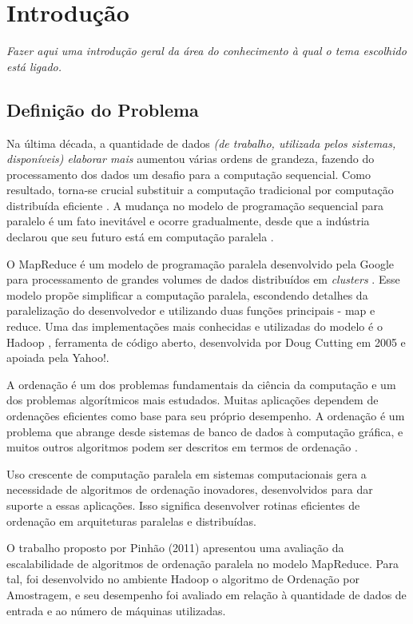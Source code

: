 \chapter{Introdução}
\label{cap:introducao}

\textit{Fazer aqui uma introdução geral da área do conhecimento à qual o tema escolhido está ligado.}

\section{Definição do Problema}

Na última década, a quantidade de dados\textit{ (de trabalho, utilizada pelos sistemas, disponíveis) elaborar mais} aumentou várias ordens de grandeza, fazendo do processamento dos dados um desafio para a computação sequencial. Como resultado, torna-se crucial substituir a computação tradicional por computação distribuída eficiente \cite{Lin:2010}. A mudança no modelo de programação sequencial para paralelo é um fato inevitável e ocorre gradualmente, desde que a indústria declarou que seu futuro está em computação paralela \cite{Asanovic:2009}. 

O MapReduce é um modelo de programação paralela desenvolvido pela Google para processamento de grandes volumes de dados distribuídos em \textit{clusters} \cite{Dean:2008}. Esse modelo propõe simplificar a computação paralela, escondendo detalhes da paralelização do desenvolvedor e utilizando duas funções principais - map e reduce.
Uma das implementações mais conhecidas e utilizadas do modelo é o Hadoop \cite{Hadoop:2010}, ferramenta de código aberto, desenvolvida por Doug Cutting em 2005 e apoiada pela Yahoo!. 


A ordenação é um dos problemas fundamentais da ciência da computação e um dos problemas algorítmicos mais estudados. Muitas aplicações dependem de ordenações eficientes como base para seu próprio desempenho. A ordenação é um problema que abrange desde sistemas de banco de dados à computação gráfica, e muitos outros algoritmos podem ser descritos em termos de ordenação  \cite{Satish:2009,Amato:1996}.  

Uso crescente de computação paralela em sistemas computacionais gera a necessidade de algoritmos de ordenação inovadores, desenvolvidos para dar suporte a essas aplicações. Isso significa desenvolver rotinas eficientes de ordenação em arquiteturas paralelas e distribuídas. 

O trabalho proposto por Pinhão (2011) %
apresentou uma avaliação da escalabilidade de algoritmos de ordenação paralela no modelo MapReduce. Para tal, foi desenvolvido no ambiente Hadoop o algoritmo de Ordenação por Amostragem, e seu desempenho foi avaliado em relação à quantidade de dados de entrada e ao número de máquinas utilizadas. 

